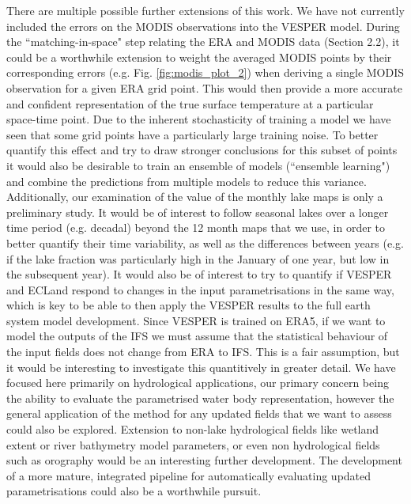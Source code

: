 \documentclass[hess, twostagejnl]{copernicus}
\begin{document}
There are multiple possible further extensions of this work. We have not currently included the errors on the MODIS observations into the VESPER model. During the “matching-in-space" step relating the ERA and MODIS data (Section 2.2), it could be a worthwhile extension to weight the averaged MODIS points by their corresponding errors (e.g. Fig. \ref{fig:modis_plot_2}) when deriving a single MODIS observation for a given ERA grid point. This would then provide a more accurate and confident representation of the true surface temperature at a particular space-time point. Due to the inherent stochasticity of training a model we have seen that some grid points have a particularly large training noise. To better quantify this effect and try to draw stronger conclusions for this subset of points it would also be desirable to train an ensemble of models (“ensemble learning") and combine the predictions from multiple models to reduce this variance. Additionally, our examination of the value of the monthly lake maps is only a preliminary study. It would be of interest to follow seasonal lakes over a longer time period (e.g. decadal) beyond the 12 month maps that we use, in order to better quantify their time variability, as well as the differences between years (e.g. if the lake fraction was particularly high in the January of one year, but low in the subsequent year). It would also be of interest to try to quantify if VESPER and ECLand respond to changes in the input parametrisations in the same way, which is key to be able to then apply the VESPER results to the full earth system model development. Since VESPER is trained on ERA5, if we want to model the outputs of the IFS we must assume that the statistical behaviour of the input fields does not change from ERA to IFS. This is a fair assumption, but it would be interesting to investigate this quantitively in greater detail. We have focused here primarily on hydrological applications, our primary concern being the ability to evaluate the parametrised water body representation, however the general application of the method for any updated fields that we want to assess could also be explored. Extension to non-lake hydrological fields like wetland extent or river bathymetry model parameters, or even non hydrological fields such as orography would be an interesting further development. The development of a more mature, integrated pipeline for automatically evaluating updated parametrisations could also be a worthwhile pursuit. \newline 
\end{document}
